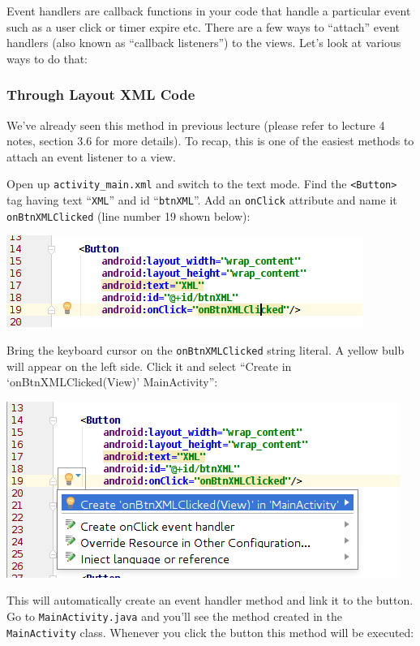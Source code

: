 Event handlers are callback functions in your code that handle a particular event such as a user click or timer expire etc. There are a few ways to ``attach'' event handlers (also known as ``callback listeners'') to the views. Let's look at various ways to do that:

\subsubsection{Through Layout XML Code}
We've already seen this method in previous lecture (please refer to lecture 4 notes, section 3.6 for more details). To recap, this is one of the easiest methods to attach an event listener to a view. 

Open up \texttt{activity\_main.xml} and switch to the text mode. Find the \texttt{<Button>} tag having text ``\texttt{XML}'' and id ``\texttt{btnXML}''. Add an \texttt{onClick} attribute and name it \texttt{onBtnXMLClicked} (line number 19 shown below):

\begin{center}
	\includegraphics[scale=0.4]{chapters/ch05/images/2}
\end{center}

Bring the keyboard cursor on the \texttt{onBtnXMLClicked} string literal. A yellow bulb will appear on the left side. Click it and select ``Create in `onBtnXMLClicked(View)' MainActivity'':

\begin{center}
	\includegraphics[scale=0.4]{chapters/ch05/images/3}
\end{center}

This will automatically create an event handler method and link it to the button. Go to \texttt{MainActivity.java} and you'll see the method created in the \texttt{MainActivity} class. Whenever you click the button this method will be executed:

